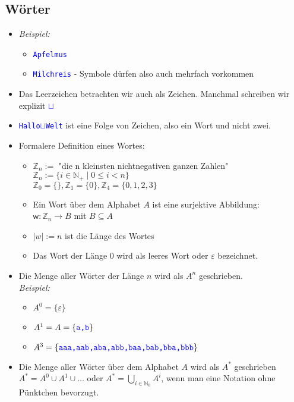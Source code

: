 \documentclass{article}
\newcommand{\N}{\mathbb{N_+}} %
\newcommand{\Nz}{{\mathbb{N}_0}} %
\newcommand{\Z}{\mathbb{Z}} %
\newcommand{\leer}{$\varepsilon$}
\newcommand{\blue}[1]{\textcolor{blue}{#1}}
\newcommand{\important}[1]{\textcolor{importantColor}{#1}}
\newcommand{\example}[1]{\textit{Beispiel: }#1}
\newcommand{\word}[1]{\blue{\texttt{#1}}}
\newcommand{\set}[1]{\{#1\}}
\newcommand{\w}{\textsf{w}}
\newcommand{\wsp}{\word{\tiny $\sqcup$}}
\begin{document}
\subsection{Wörter}
\begin{itemize}
    \item \example
    \begin{itemize}
        \item \word{Apfelmus}
        \item \word{Milchreis} - Symbole dürfen also auch mehrfach vorkommen
    \end{itemize}
    \item Das Leerzeichen betrachten wir auch als Zeichen. Manchmal schreiben wir explizit \wsp
    \item \word{Hallo\wsp Welt} ist \important{eine} Folge von Zeichen, also \important{ein} Wort und nicht zwei.
    \item Formalere Definition eines Wortes:
    \begin{itemize}
        \item $\Z_n :=$ "die n kleinsten nichtnegativen ganzen Zahlen"\\
        $\Z_n := \set{i \in \N \mid 0\leq i < n}$\\
        \example$\Z_0 = \set{}, \Z_1 = \set{0}, \Z_4 = \set{0,1,2,3}$
        \item Ein Wort über dem Alphabet $A$ ist eine \important{surjektive Abbildung}:\\
        $\w: \Z_n \to B$  mit $B\subseteq A$ 
        \item \important{$|w| := n$} ist die Länge des Wortes
        \item Das Wort der Länge 0 wird als \important{leeres Wort} oder \important{\leer} bezeichnet.
    \end{itemize}
    \item Die Menge aller Wörter der Länge $n$ wird als \important{$A^n$} geschrieben.\\\example
    \begin{itemize}
        \item $A^0=\{$\leer$\}$
        \item $A^1 = A = \set{\word{a,b}}$
        \item $A^3 = \set{\word{aaa,aab,aba,abb,baa,bab,bba,bbb}}$
    \end{itemize}
    \item Die Menge aller Wörter über dem Alphabet $A$ wird als $A^*$ geschrieben\\
    $A^*=A^0\cup A^1\cup\dots$ oder $\displaystyle{A^* = \bigcup_{i\in \Nz}A^i}$, wenn man eine Notation ohne Pünktchen bevorzugt.

\end{itemize}
\end{document}
